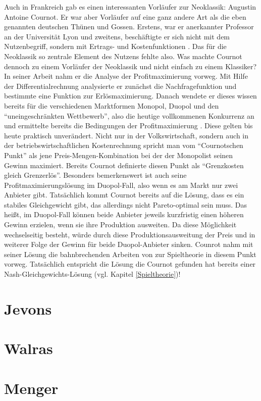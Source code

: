 Auch in Frankreich gab es einen interessanten Vorläufer zur Neoklassik: Augustin Antoine Cournot. Er war aber Vorläufer auf eine ganz andere Art als die eben genannten deutschen Thünen und Gossen. Erstens, war er anerkannter Professor an der Universität Lyon und zweitens, beschäftigte er sich nicht mit dem Nutzenbegriff, sondern mit Ertrags- und Kostenfunktionen \parencite[S. 287f]{Rosner2012}. Das für die Neoklassik so zentrale Element des Nutzens fehlte also. Was machte Cournot dennoch zu einem Vorläufer der Neoklassik und nicht einfach zu einem Klassiker? In seiner Arbeit \textcite{Cournot1838} nahm er die Analyse der Profitmaximierung vorweg. Mit Hilfe der Differentialrechnung analysierte er zunächst die Nachfragefunktion und bestimmte eine Funktion zur Erlösmaximierung. Danach wendete er dieses wissen bereits für die verschiedenen Marktformen Monopol, Duopol und den "`uneingeschränkten Wettbewerb"', also die heutige vollkommenen Konkurrenz an und ermittelte bereits die Bedingungen der Profitmaximierung \parencite[S. 289]{Rosner2012}. Diese gelten bis heute praktisch unverändert. Nicht nur in der Volkswirtschaft, sondern auch in der betriebswirtschaftlichen Kostenrechnung spricht man vom "`Cournotschen Punkt"' als jene Preis-Mengen-Kombination bei der der Monopolist seinen Gewinn maximiert. Bereits Cournot definierte diesen Punkt als "`Grenzkosten gleich Grenzerlös"'. Besonders bemerkenswert ist auch seine Profitmaximierungslösung im Duopol-Fall, also wenn es am Markt nur zwei Anbieter gibt. Tatsächlich kommt Cournot bereits auf die Lösung, dass es ein stabiles Gleichgewicht gibt, das allerdings nicht Pareto-optimal sein muss. Das heißt, im Duopol-Fall können beide Anbieter jeweils kurzfristig einen höheren Gewinn erzielen, wenn sie ihre Produktion ausweiten. Da diese Möglichkeit wechselseitig besteht, würde durch diese Produktionsausweitung der Preis und in weiterer Folge der Gewinn für beide Duopol-Anbieter sinken. Counrot nahm mit seiner Lösung die bahnbrechenden Arbeiten von \textcite{Nash1950} zur Spieltheorie in diesem Punkt vorweg. Tatsächlich entspricht die Lösung die Cournot gefunden hat bereits einer Nash-Gleichgewichts-Lösung (vgl. Kapitel \ref{Spieltheorie})!


\section{Jevons}
\label{Jevons}

\section{Walras}
\label{Walras}

\section{Menger}
\label{Wiener Schule}

